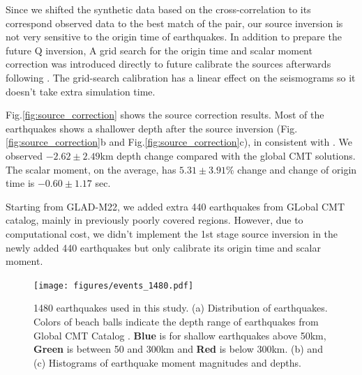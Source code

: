 \documentclass[extra,mreferee]{gji}
\begin{document}
Since we shifted the synthetic data based on the cross-correlation to its correspond observed
data to the best match of the pair, our source inversion is not very sensitive to
the origin time of earthquakes. In addition to prepare the future Q inversion,
A grid search for the origin time and scalar moment correction was introduced
directly to future calibrate the sources afterwards following \cite{zhu2012structure}.
The grid-search calibration has a linear effect on the seismograms so it doesn't take extra
simulation time.

Fig.\ref{fig:source_correction} shows the source correction results.
Most of the earthquakes shows a shallower depth after the source inversion
(Fig.\ref{fig:source_correction}b and Fig.\ref{fig:source_correction}c),
in consistent with \cite{hjorleifsdottir2010effects}.
We observed $-2.62\pm2.49$km depth change compared with the global CMT solutions.
The scalar moment, on the average, has $5.31\pm3.91$\% change and change of origin time
is $-0.60\pm1.17$ sec.

Starting from GLAD-M22, we added extra 440 earthquakes from GLobal CMT catalog,
mainly in previously poorly covered regions. However, due to computational cost,
we didn't implement the 1st stage source inversion in the newly added 440
earthquakes but only calibrate its origin time and scalar moment.

\begin{figure}
  \centering
  \texttt{[image: figures/events\_1480.pdf]}
  \caption{1480 earthquakes used in this study. (a) Distribution of earthquakes. Colors of beach balls indicate the depth range of earthquakes from Global CMT Catalog \citep{ekstrom2012global}. {\textbf{\color{Blue} Blue}} is for shallow earthquakes above 50km, \textbf{{\color{ForestGreen} Green}} is between 50 and 300km and \textbf{{\color{Red} Red}} is below 300km. (b) and (c) Histograms of earthquake moment magnitudes and depths.}
  \label{fig:event_1480}
\end{figure}
\end{document}
